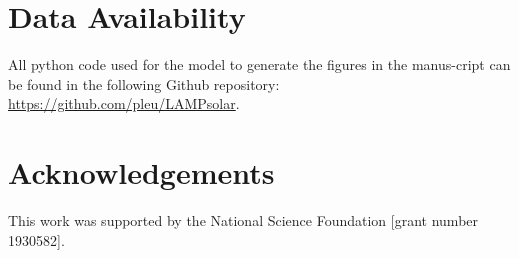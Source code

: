 \documentclass[preprint,12pt]{elsarticle}
\begin{document}




%
%

\section{Data Availability}

All python code used for the model to generate the figures in the manus-cript can be found in the following Github repository: \\ \url{https://github.com/pleu/LAMPsolar}.

\section{Acknowledgements}
This work was supported by the National Science Foundation [grant number 1930582].





\end{document}
